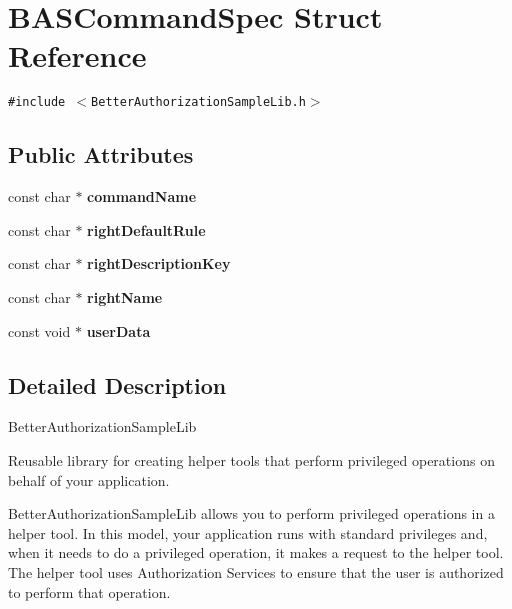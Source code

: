 \hypertarget{struct_b_a_s_command_spec}{
\section{BASCommandSpec Struct Reference}
\label{struct_b_a_s_command_spec}
}
{\tt \#include $<$BetterAuthorizationSampleLib.h$>$}

\subsection*{Public Attributes}
\begin{CompactItemize}
\item 
\hypertarget{struct_b_a_s_command_spec_979075c089fd8906f2ae3031d16ceec5}{
const char $\ast$ \textbf{commandName}}
\label{struct_b_a_s_command_spec_979075c089fd8906f2ae3031d16ceec5}

\item 
\hypertarget{struct_b_a_s_command_spec_a7a8c093ae494cdeb2af57614c6d73d5}{
const char $\ast$ \textbf{rightDefaultRule}}
\label{struct_b_a_s_command_spec_a7a8c093ae494cdeb2af57614c6d73d5}

\item 
\hypertarget{struct_b_a_s_command_spec_0735b9e5ca51435ede02cf36899a5c7e}{
const char $\ast$ \textbf{rightDescriptionKey}}
\label{struct_b_a_s_command_spec_0735b9e5ca51435ede02cf36899a5c7e}

\item 
\hypertarget{struct_b_a_s_command_spec_539245412d7ca050e56720daeaede31e}{
const char $\ast$ \textbf{rightName}}
\label{struct_b_a_s_command_spec_539245412d7ca050e56720daeaede31e}

\item 
\hypertarget{struct_b_a_s_command_spec_cc26a480c6590a31ac0fdbff6c999254}{
const void $\ast$ \textbf{userData}}
\label{struct_b_a_s_command_spec_cc26a480c6590a31ac0fdbff6c999254}

\end{CompactItemize}


\subsection{Detailed Description}
BetterAuthorizationSampleLib

Reusable library for creating helper tools that perform privileged operations on behalf of your application.

BetterAuthorizationSampleLib allows you to perform privileged operations in a helper tool. In this model, your application runs with standard privileges and, when it needs to do a privileged operation, it makes a request to the helper tool. The helper tool uses Authorization Services to ensure that the user is authorized to perform that operation.

